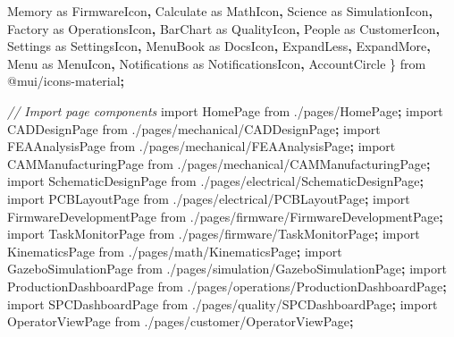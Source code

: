 \documentclass[
]{article}
\newenvironment{Shaded}{\begin{snugshade}}{\end{snugshade}}
\newcommand{\CommentTok}[1]{\textcolor[rgb]{0.56,0.35,0.01}{\textit{#1}}}
\newcommand{\ImportTok}[1]{#1}
\newcommand{\NormalTok}[1]{#1}
\newcommand{\OperatorTok}[1]{\textcolor[rgb]{0.81,0.36,0.00}{\textbf{#1}}}
\newcommand{\StringTok}[1]{\textcolor[rgb]{0.31,0.60,0.02}{#1}}
\begin{document}
\begin{Shaded}
\begin{Highlighting}[]
\NormalTok{  Memory }\ImportTok{as}\NormalTok{ FirmwareIcon}\OperatorTok{,}
\NormalTok{  Calculate }\ImportTok{as}\NormalTok{ MathIcon}\OperatorTok{,}
\NormalTok{  Science }\ImportTok{as}\NormalTok{ SimulationIcon}\OperatorTok{,}
\NormalTok{  Factory }\ImportTok{as}\NormalTok{ OperationsIcon}\OperatorTok{,}
\NormalTok{  BarChart }\ImportTok{as}\NormalTok{ QualityIcon}\OperatorTok{,}
\NormalTok{  People }\ImportTok{as}\NormalTok{ CustomerIcon}\OperatorTok{,}
\NormalTok{  Settings }\ImportTok{as}\NormalTok{ SettingsIcon}\OperatorTok{,}
\NormalTok{  MenuBook }\ImportTok{as}\NormalTok{ DocsIcon}\OperatorTok{,}
\NormalTok{  ExpandLess}\OperatorTok{,}\NormalTok{ ExpandMore}\OperatorTok{,}
\NormalTok{  Menu }\ImportTok{as}\NormalTok{ MenuIcon}\OperatorTok{,}
\NormalTok{  Notifications }\ImportTok{as}\NormalTok{ NotificationsIcon}\OperatorTok{,}
\NormalTok{  AccountCircle}
\NormalTok{\} }\ImportTok{from} \StringTok{\textquotesingle{}@mui/icons{-}material\textquotesingle{}}\OperatorTok{;}

\CommentTok{// Import page components}
\ImportTok{import}\NormalTok{ HomePage }\ImportTok{from} \StringTok{\textquotesingle{}./pages/HomePage\textquotesingle{}}\OperatorTok{;}
\ImportTok{import}\NormalTok{ CADDesignPage }\ImportTok{from} \StringTok{\textquotesingle{}./pages/mechanical/CADDesignPage\textquotesingle{}}\OperatorTok{;}
\ImportTok{import}\NormalTok{ FEAAnalysisPage }\ImportTok{from} \StringTok{\textquotesingle{}./pages/mechanical/FEAAnalysisPage\textquotesingle{}}\OperatorTok{;}
\ImportTok{import}\NormalTok{ CAMManufacturingPage }\ImportTok{from} \StringTok{\textquotesingle{}./pages/mechanical/CAMManufacturingPage\textquotesingle{}}\OperatorTok{;}
\ImportTok{import}\NormalTok{ SchematicDesignPage }\ImportTok{from} \StringTok{\textquotesingle{}./pages/electrical/SchematicDesignPage\textquotesingle{}}\OperatorTok{;}
\ImportTok{import}\NormalTok{ PCBLayoutPage }\ImportTok{from} \StringTok{\textquotesingle{}./pages/electrical/PCBLayoutPage\textquotesingle{}}\OperatorTok{;}
\ImportTok{import}\NormalTok{ FirmwareDevelopmentPage }\ImportTok{from} \StringTok{\textquotesingle{}./pages/firmware/FirmwareDevelopmentPage\textquotesingle{}}\OperatorTok{;}
\ImportTok{import}\NormalTok{ TaskMonitorPage }\ImportTok{from} \StringTok{\textquotesingle{}./pages/firmware/TaskMonitorPage\textquotesingle{}}\OperatorTok{;}
\ImportTok{import}\NormalTok{ KinematicsPage }\ImportTok{from} \StringTok{\textquotesingle{}./pages/math/KinematicsPage\textquotesingle{}}\OperatorTok{;}
\ImportTok{import}\NormalTok{ GazeboSimulationPage }\ImportTok{from} \StringTok{\textquotesingle{}./pages/simulation/GazeboSimulationPage\textquotesingle{}}\OperatorTok{;}
\ImportTok{import}\NormalTok{ ProductionDashboardPage }\ImportTok{from} \StringTok{\textquotesingle{}./pages/operations/ProductionDashboardPage\textquotesingle{}}\OperatorTok{;}
\ImportTok{import}\NormalTok{ SPCDashboardPage }\ImportTok{from} \StringTok{\textquotesingle{}./pages/quality/SPCDashboardPage\textquotesingle{}}\OperatorTok{;}
\ImportTok{import}\NormalTok{ OperatorViewPage }\ImportTok{from} \StringTok{\textquotesingle{}./pages/customer/OperatorViewPage\textquotesingle{}}\OperatorTok{;}


\end{Highlighting}
\end{Shaded}
\end{document}
